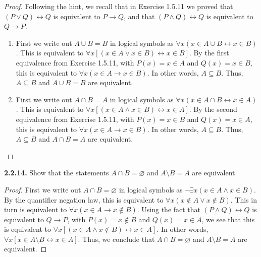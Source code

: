 \documentclass[12pt]{amsart}
\newenvironment{statement}[1]{\smallskip\noindent\color[rgb]{.6627, .3529, .6314} {\bf #1.}}{}
\theoremstyle{definition}
\theoremstyle{remark}
\begin{document}
\begin{proof}
Following the hint, we recall that in Exercise 1.5.11 we proved that
$(P \vee Q) \leftrightarrow Q$ is equivalent to $P \rightarrow Q$, and that
$(P \wedge Q) \leftrightarrow Q$ is equivalent to $Q \rightarrow P$.
\begin{enumerate}
	\item First we write out $A \cup B = B$ in logical symbols as
	$\forall x (x \in A \cup B \leftrightarrow x \in B)$.
	This is equivalent to $\forall x [(x \in A \vee x \in B) \leftrightarrow x \in B]$.
	By the first equivalence from Exercise 1.5.11, with $P(x) = x \in A$ and $Q(x) = x \in B$,
	this is equivalent to $\forall x (x \in A \rightarrow x \in B)$.
	In other words, $A \subseteq B$.
	Thus, $A \subseteq B$ and $A \cup B = B$ are equivalent.
	
	\item First we write out $A \cap B = A$ in logical symbols as
	$\forall x (x \in A \cap B \leftrightarrow x \in A)$.
	This is equivalent to $\forall x [(x \in A \wedge x \in B) \leftrightarrow x \in A]$.
	By the second equivalence from Exercise 1.5.11, with $P(x) = x \in B$ and $Q(x) = x \in A$,
	this is equivalent to $\forall x (x \in A \rightarrow x \in B)$.
	In other words, $A \subseteq B$.
	Thus, $A \subseteq B$ and $A \cap B = A$ are equivalent.
\end{enumerate}
\end{proof}


\begin{statement}{2.2.14}
Show that the statements $A \cap B = \varnothing$ and $A \setminus B = A$ are equivalent.
\end{statement}

\begin{proof}
First we write out $A \cap B = \varnothing$ in logical symbols as 
$\neg \exists x (x \in A \wedge x \in B)$.
By the quantifier negation law, this is equivalent to $\forall x (x \notin A \vee x \notin B)$.
This in turn is equivalent to $\forall x (x \in A \rightarrow x \notin B)$.
Using the fact that $(P \wedge Q) \leftrightarrow Q$ is equivalent to $Q \rightarrow P$,
with $P(x) = x \notin B$ and $Q(x) = x \in A$, we see that this is equivalent to
$\forall x [(x \in A \wedge x \notin B) \leftrightarrow x \in A]$.
In other words, $\forall x [x \in A \setminus B \leftrightarrow x \in A]$.
Thus, we conclude that $A \cap B = \varnothing$ and $A \setminus B = A$ are equivalent.
\end{proof}
\end{document}
